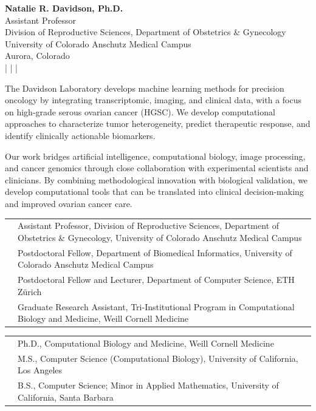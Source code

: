 \begin{center}
{\LARGE\bfseries Natalie R. Davidson, Ph.D.}\\[0.4ex]
{\large Assistant Professor}\\[0.3ex]
Division of Reproductive Sciences, Department of Obstetrics \& Gynecology\\
University of Colorado Anschutz Medical Campus\\
Aurora, Colorado\\[0.5ex]

\;|\;
\;|\;
\;|\;
\end{center}

\vspace{0.2em}
The Davidson Laboratory develops machine learning methods for precision oncology by integrating transcriptomic, imaging, and clinical data, with a focus on high-grade serous ovarian cancer (HGSC). We develop computational approaches to characterize tumor heterogeneity, predict therapeutic response, and identify clinically actionable biomarkers.

Our work bridges artificial intelligence, computational biology, image processing, and cancer genomics through close collaboration with experimental scientists and clinicians. By combining methodological innovation with biological validation, we develop computational tools that can be translated into clinical decision-making and improved ovarian cancer care.

\begin{tabularx}{\textwidth}{@{}p{1.1in}Y@{}}
 & Assistant Professor, Division of Reproductive Sciences, Department of Obstetrics \& Gynecology, University of Colorado Anschutz Medical Campus \\
 & Postdoctoral Fellow, Department of Biomedical Informatics, University of Colorado Anschutz Medical Campus \\
 & Postdoctoral Fellow and Lecturer, Department of Computer Science, ETH Zürich \\
 & Graduate Research Assistant, Tri-Institutional Program in Computational Biology and Medicine, Weill Cornell Medicine 
\end{tabularx}

\begin{tabularx}{\textwidth}{@{}p{1.1in}Y@{}}
 & Ph.D., Computational Biology and Medicine, Weill Cornell Medicine \\
 & M.S., Computer Science (Computational Biology), University of California, Los Angeles \\
 & B.S., Computer Science; Minor in Applied Mathematics, University of California, Santa Barbara
\end{tabularx}

